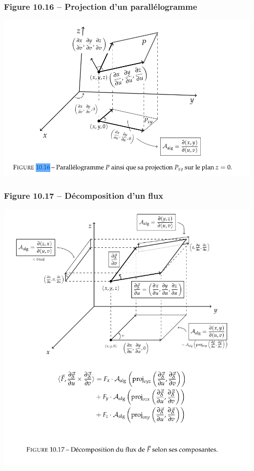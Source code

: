 \documentclass[12pt, a4paper]{article}
\begin{document}
\subsubsection{Figure 10.16 -- Projection d'un parallélogramme}
\begin{center}
\includegraphics[scale=0.4]{images/MATH-H2000_10_16}
\end{center}
\subsubsection{Figure 10.17 -- Décomposition d'un flux}
\begin{center}
\includegraphics[scale=0.4]{images/MATH-H2000_10_17}
\end{center}
\end{document}
